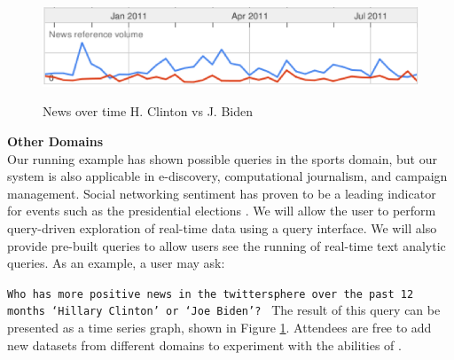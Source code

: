 \begin{figure}
\begin{center}
	\includegraphics[scale=.35]{content/graphics/timeseries.png}
	\label{fig:timeseries}
	\caption{News over time H. Clinton vs J. Biden} 
\end{center}
\end{figure}


\noindent
\textbf{Other Domains}\\
Our running example has shown possible 
queries in the sports domain, but our system is also 
applicable in e-discovery, computational journalism, and 
campaign management.
Social networking sentiment has proven to be a leading indicator
for events such as the presidential elections \cite{o2010tweets}.
We will allow the user to perform query-driven 
exploration of real-time data using a query interface.
We will also provide pre-built 
queries to allow users see the running of real-time 
text analytic queries. As an example, a user may ask:

{\tt Who has more positive news in the twittersphere 
over the past 12 months `Hillary Clinton' or `Joe Biden'? }
\noindent
The result of this query
can be presented as a time series graph, shown in Figure \ref{fig:timeseries}.
Attendees are free to add new datasets from different domains to 
experiment with the abilities of \system.



